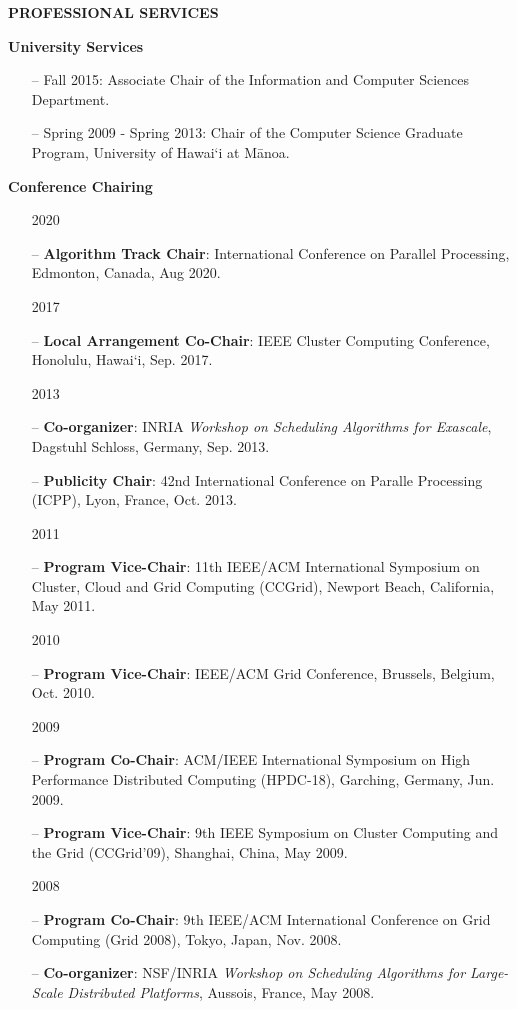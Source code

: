 \documentclass[times,11pt]{letter}
\begin{document}
\noindent
{\large\bf{PROFESSIONAL SERVICES}}

\noindent
{\bf University Services}
\begin{itemize}
\item [--] Fall 2015: Associate Chair of the Information and Computer Sciences Department. 
\item [--] Spring 2009 - Spring 2013: Chair of the Computer Science Graduate Program, University of Hawai`i at M\=anoa.
\end{itemize}

\noindent
{\bf Conference Chairing}

\begin{itemize}
\item [2020]
\item[--] {\bf Algorithm Track Chair}: International Conference on Parallel Processing, Edmonton, Canada, Aug 2020.
\item [2017]
\item[--] {\bf Local Arrangement Co-Chair}: IEEE Cluster Computing Conference, Honolulu, Hawai`i, Sep. 2017. 
\item [2013]
\item[--] {\bf Co-organizer}: INRIA \emph{Workshop on Scheduling Algorithms for Exascale}, Dagstuhl Schloss, Germany, Sep. 2013.
\item[--] {\bf Publicity Chair}: 42nd International Conference on Paralle Processing (ICPP),  Lyon, France, Oct. 2013.
\item [2011]
\item[--] {\bf Program Vice-Chair}: 11th IEEE/ACM International Symposium on Cluster, Cloud and Grid Computing (CCGrid), Newport Beach, California, May 2011.
\item [2010]
\item[--] {\bf Program Vice-Chair}: IEEE/ACM Grid Conference, Brussels, Belgium, Oct. 2010.
\item [2009]
\item[--] {\bf Program Co-Chair}: ACM/IEEE International Symposium on High Performance Distributed Computing (HPDC-18), Garching, Germany, Jun. 2009.
\item[--] {\bf Program Vice-Chair}: 9th IEEE Symposium on Cluster Computing and the Grid (CCGrid'09), Shanghai, China, May 2009.
\item [2008]
\item[--] {\bf Program Co-Chair}: 9th IEEE/ACM International Conference on Grid Computing (Grid 2008), Tokyo, Japan, Nov. 2008.
\item[--] {\bf Co-organizer}: NSF/INRIA \emph{Workshop on Scheduling Algorithms for Large-Scale Distributed Platforms}, Aussois, France, May 2008.

\end{itemize}
\end{document}
